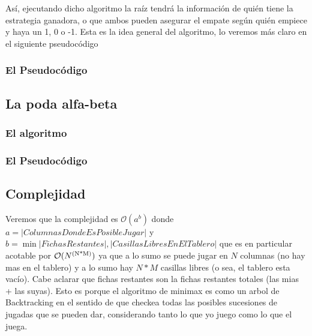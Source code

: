 \documentclass[A4paper,oneside,fleqn,11pt]{article}
\theoremstyle{definition}
\begin{document}
Así, ejecutando dicho algoritmo la raíz tendrá la información de quién tiene la estrategia ganadora, o que ambos pueden asegurar el empate según quién empiece y haya un 1, 0 o -1. Esta es la idea general del algoritmo, lo veremos más claro en el siguiente pseudocódigo

\subsubsection{El Pseudocódigo}


\subsection{La poda alfa-beta}


\subsubsection{El algoritmo}

\subsubsection{El Pseudocódigo}



\subsection{Complejidad}

Veremos que la complejidad es $\mathcal{O}(a^b)$ donde $a=|Columnas Donde Es Posible Jugar|$ y $b = \min{|FichasRestantes|,|Casillas Libres En El Tablero|}$ que es en particular acotable por $\mathcal{O}(N\textsuperscript{(N*M)})$ ya que a lo sumo se puede jugar en $N$ columnas (no hay mas en el tablero) y a lo sumo hay $N*M$ casillas libres (o sea, el tablero esta vacío). Cabe aclarar que fichas restantes son la fichas restantes totales (las mias + las suyas). Esto es porque el algoritmo de minimax es como un arbol de Backtracking en el sentido de que checkea todas las posibles sucesiones de jugadas que se pueden dar, considerando tanto lo que yo juego como lo que el juega.
\end{document}
